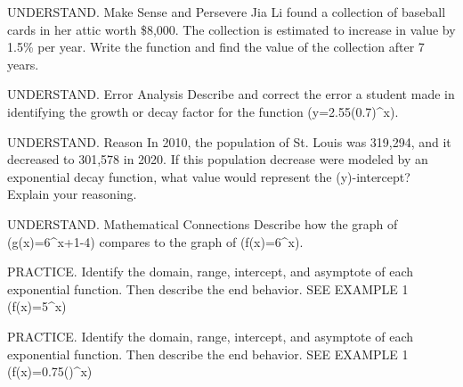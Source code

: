 \documentclass{article}
\newenvironment{practice}[2]{}{}        %
\newcommand{\answer}[1]{}               %
\newcommand{\te}[1]{}                   %
\begin{document}
\begin{practice}{10}{2}
UNDERSTAND. Make Sense and Persevere Jia Li found a collection of baseball cards in her attic worth \$8,000. The collection is estimated to increase in value by 1.5\% per year. Write the function and find the value of the collection after 7 years.
\answer{(f(x)=8,000(1.015)^x); \$8,878.76}
\end{practice}
\begin{practice}{11}{2}
UNDERSTAND. Error Analysis Describe and correct the error a student made in identifying the growth or decay factor for the function (y=2.55(0.7)^x).
\te{Student work, marked with red X: Step 1 The base of the function is 0.7, so it represents exponential decay. Step 2 The function in the form (y=a(1-r)^x) is (y=2.55(1-0.7)^x). Step 3 The decay factor is 0.3.}
\answer{The rate is 0.3, so the decay factor is 0.7.}
\end{practice}
\begin{practice}{12}{2}
UNDERSTAND. Reason In 2010, the population of St. Louis was 319,294, and it decreased to 301,578 in 2020. If this population decrease were modeled by an exponential decay function, what value would represent the (y)-intercept? Explain your reasoning.
\answer{319,294; This is the population for the first known year of data. The year 2010 acts as 0.}
\end{practice}
\begin{practice}{13}{2}
UNDERSTAND. Mathematical Connections Describe how the graph of (g(x)=6^{x+1}-4) compares to the graph of (f(x)=6^x).
\answer{The graph of (g(x)) is shifted 4 units down and 1 unit to the left.}
\end{practice}
\begin{practice}{14}{1}
PRACTICE. Identify the domain, range, intercept, and asymptote of each exponential function. Then describe the end behavior. SEE EXAMPLE 1
(f(x)=5^x)
\answer{domain: all real numbers; range: (\{y\mid y>0\}); (y)-intercept 5; asymptote: (x)-axis; end behavior: As (x\to-\infty), (y\to0). As (x\to\infty), (y\to\infty).}
\end{practice}
\begin{practice}{15}{1}
PRACTICE. Identify the domain, range, intercept, and asymptote of each exponential function. Then describe the end behavior. SEE EXAMPLE 1
(f(x)=0.75()^x)
\answer{domain: all real numbers; range: (\{y\mid y>0\}); (y)-intercept 0.75; asymptote: (x)-axis; end behavior: As (x\to-\infty), (y\to\infty). As (x\to\infty), (y\to0).}
\end{practice}
\end{document}
